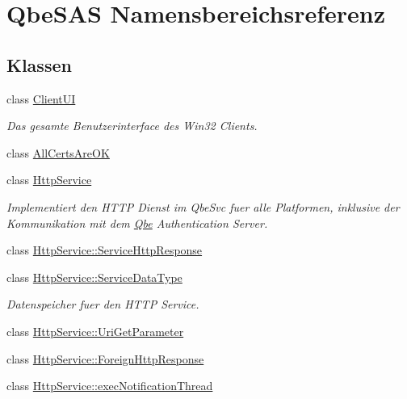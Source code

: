 \hypertarget{namespaceQbeSAS}{
\section{Qbe\-SAS Namensbereichsreferenz}
\label{namespaceQbeSAS}
}




\subsection*{Klassen}
\begin{CompactItemize}
\item 
class \hyperlink{classQbeSAS_1_1ClientUI}{Client\-UI}
\begin{CompactList}\small\item\em Das gesamte Benutzerinterface des Win32 Clients. \item\end{CompactList}\item 
class \hyperlink{classQbeSAS_1_1AllCertsAreOK}{All\-Certs\-Are\-OK}
\item 
class \hyperlink{classQbeSAS_1_1HttpService}{Http\-Service}
\begin{CompactList}\small\item\em Implementiert den HTTP Dienst im Qbe\-Svc fuer alle Platformen, inklusive der Kommunikation mit dem \hyperlink{namespaceQbe}{Qbe} Authentication Server. \item\end{CompactList}\item 
class \hyperlink{classQbeSAS_1_1HttpService_1_1ServiceHttpResponse}{Http\-Service::Service\-Http\-Response}
\item 
class \hyperlink{classQbeSAS_1_1HttpService_1_1ServiceDataType}{Http\-Service::Service\-Data\-Type}
\begin{CompactList}\small\item\em Datenspeicher fuer den HTTP Service. \item\end{CompactList}\item 
class \hyperlink{classQbeSAS_1_1HttpService_1_1UriGetParameter}{Http\-Service::Uri\-Get\-Parameter}
\item 
class \hyperlink{classQbeSAS_1_1HttpService_1_1ForeignHttpResponse}{Http\-Service::Foreign\-Http\-Response}
\item 
class \hyperlink{classQbeSAS_1_1HttpService_1_1execNotificationThread}{Http\-Service::exec\-Notification\-Thread}
\item 

\end{CompactItemize}
